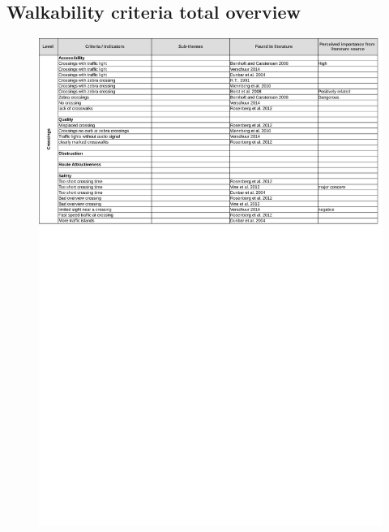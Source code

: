 \begin{appendix}
\section{Walkability criteria total overview}\label{Acriteria}
\begin{figure}[h]
\includegraphics[width=\textwidth]{img/annex/A1_crossings_criteria.pdf}
\end{figure}
\begin{figure}[h]

\end{figure}
\end{appendix}
